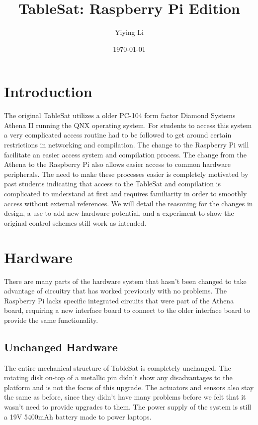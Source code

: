 \documentclass[conference, onecolumn, 12pt]{IEEEtran}
\begin{document}
\title{TableSat: Raspberry Pi Edition}
\author{Yiying Li}
\date{\today}

\maketitle

\section{Introduction}
The original TableSat utilizes a older PC-104 form factor Diamond Systems Athena II running the QNX operating system. For students to access this system a very complicated access routine had to be followed to get around certain restrictions in networking and compilation. The change to the Raspberry Pi will facilitate an easier access system and compilation process. The change from the Athena to the Raspberry Pi also allows easier access to common hardware peripherals. The need to make these processes easier is completely motivated by past students indicating that access to the TableSat and compilation is complicated to understand at first and requires familiarity in order to smoothly access without external references. We will detail the reasoning for the changes in design, a use to add new hardware potential, and a experiment to show the original control schemes still work as intended.

\section{Hardware}
There are many parts of the hardware system that hasn't been changed to take advantage of circuitry that has worked previously with no problems. The Raspberry Pi lacks specific integrated circuits that were part of the Athena board, requiring a new interface board to connect to the older interface board to provide the same functionality.

\subsection{Unchanged Hardware}
The entire mechanical structure of TableSat is completely unchanged. The rotating disk on-top of a metallic pin didn't show any disadvantages to the platform and is not the focus of this upgrade. The actuators and sensors also stay the same as before, since they didn't have many problems before we felt that it wasn't need to provide upgrades to them. The power supply of the system is still a 19V 5400mAh battery made to power laptops. 
\end{document}
